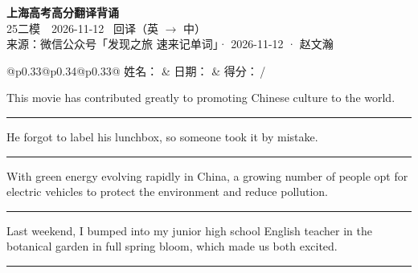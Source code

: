 \documentclass[11pt,a4paper]{article}
\newcommand{\num}[1]{\makebox[1.9em][r]{#1.}\hspace{0.3em}}
\newcommand{\wline}{\noindent\rule{\linewidth}{0.4pt}}
\begin{document}
\pagestyle{plain}
\begin{center}
{\LARGE\bfseries 上海高考高分翻译背诵 }\\[0.25em]
{\large 25二模　2026-11-12 \quad\ 回译（英 $\to$ 中）}\\[0.35em]
{\footnotesize 来源：微信公众号「发现之旅 速来记单词」· 2026-11-12 · 赵文瀚}
\end{center}

\vspace{0.4em}
\noindent\begin{tabular}{@{}p{0.33\textwidth}@{}p{0.34\textwidth}@{}p{0.33\textwidth}@{}}
姓名：\underline{\hspace{2.0cm}} & 日期：\underline{\hspace{2.0cm}} & 得分：\underline{\hspace{1.4cm}}\,/ \\
\end{tabular}

\vspace{0.5em}

\vspace{0.8em}
\num{1}This movie has contributed greatly to promoting Chinese culture to the world.

\vspace{0.25em}

\wline

\num{2}He forgot to label his lunchbox, so someone took it by mistake.

\vspace{0.25em}

\wline

\num{3}With green energy evolving rapidly in China, a growing number of people opt for electric vehicles to protect the environment and reduce pollution.

\vspace{0.25em}

\wline

\num{4}Last weekend, I bumped into my junior high school English teacher in the botanical garden in full spring bloom, which made us both excited.

\vspace{0.25em}

\wline
\end{document}
